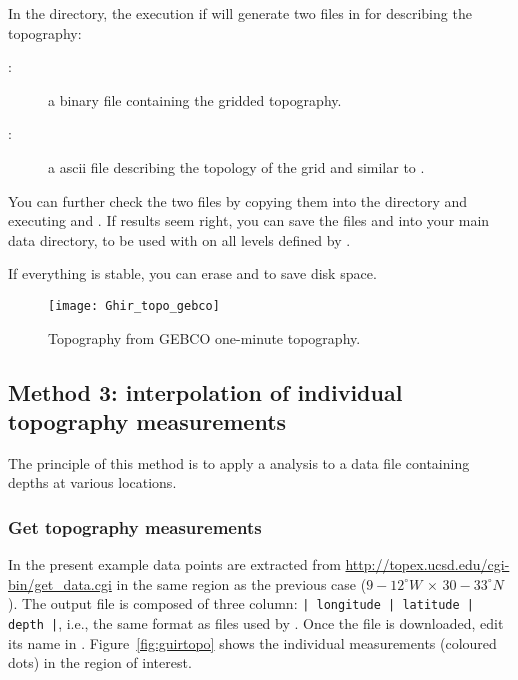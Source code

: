 In the  directory, the execution if  will generate two files in  for describing the topography:
\begin{description}
\item[:] a binary file containing the gridded topography.
\item[:] a ascii file describing the topology of the grid and similar to .
\end{description}





You can further check the two files by copying them into the  directory and executing  and . If results seem right, you can save the files  and  into your main data directory, to be used with  on all levels defined by .

If everything is stable, you can erase  and  to save disk space. 

\begin{figure}[htpb]
\centering
\texttt{[image: Ghir\_topo\_gebco]}
\caption{Topography from GEBCO one-minute topography.\label{fig:topoGebco3}}
\end{figure}


\subsection{Method 3: interpolation of individual topography measurements\label{sec:topotopex}}

The principle of this method is to apply a \diva analysis to a data file containing depths at various locations.

\subsubsection{Get topography measurements}

In the present example data points are extracted from \url{http://topex.ucsd.edu/cgi-bin/get_data.cgi} in the same region as the previous case ($9-12^{\circ}W\, \times\, 30-33^{\circ}N$). The output file is composed of three column: \texttt{| longitude | latitude | depth |}, i.e., the same format as  files used by \diva. Once the file is downloaded, edit its name in . Figure~\ref{fig:guirtopo} shows the individual measurements (coloured dots) in the region of interest. 


